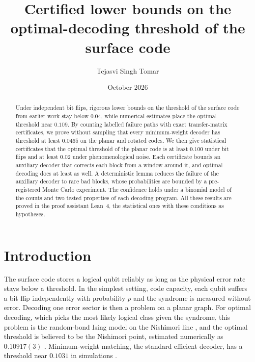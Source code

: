 \documentclass[11pt]{amsart}
\theoremstyle{definition}
\theoremstyle{remark}
\numberwithin{equation}{section}
\begin{document}
\title[Lower bounds on the surface-code threshold]{Certified lower bounds on the optimal-decoding threshold of the surface code}
\author{Tejasvi Singh Tomar}
\renewcommand{\urladdrname}{{\itshape ORCID}}
\date{October 2026}

\begin{abstract}
Under independent bit flips, rigorous lower bounds on the threshold of the surface code from earlier work stay below $0.04$, while numerical estimates place the optimal threshold near $0.109$. By counting labelled failure paths with exact transfer-matrix certificates, we prove without sampling that every minimum-weight decoder has threshold at least $0.0465$ on the planar and rotated codes. We then give statistical certificates that the optimal threshold of the planar code is at least $0.100$ under bit flips and at least $0.02$ under phenomenological noise. Each certificate bounds an auxiliary decoder that corrects each block from a window around it, and optimal decoding does at least as well. A deterministic lemma reduces the failure of the auxiliary decoder to rare bad blocks, whose probabilities are bounded by a pre-registered Monte Carlo experiment. The confidence holds under a binomial model of the counts and two tested properties of each decoding program. All these results are proved in the proof assistant Lean~4, the statistical ones with these conditions as hypotheses.
\end{abstract}

\maketitle

\section{Introduction}\label{sec:intro}

The surface code \cite{Kit03,DKLP02} stores a logical qubit reliably as long as the physical error rate stays below a threshold. In the simplest setting, code capacity, each qubit suffers a bit flip independently with probability $p$ and the syndrome is measured without error. Decoding one error sector is then a problem on a planar graph. For optimal decoding, which picks the most likely logical class given the syndrome, this problem is the random-bond Ising model on the Nishimori line \cite{Nis81,DKLP02}, and the optimal threshold is believed to be the Nishimori point, estimated numerically as $0.10917(3)$ \cite{PPV09}. Minimum-weight matching, the standard efficient decoder, has a threshold near $0.1031$ in simulations \cite{WHP03}.
\end{document}
